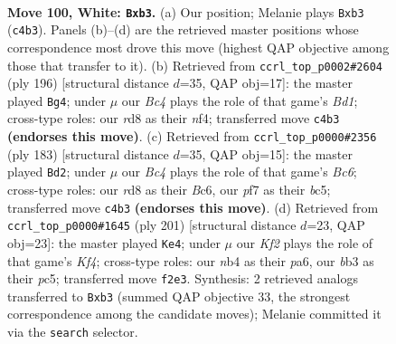 \documentclass[11pt]{article}
\begin{document}
\clearpage

\begin{figure}[p]\centering
\begin{subfigure}{0.46\textwidth}\centering
\resizebox{\linewidth}{!}{%
\newchessgame
\chessboard[
  setfen={3r4/5pk1/6p1/4P3/1nB2P1p/1b4P1/5K2/8 w - - 0 100},
  showmover=false,
  pgfstyle=straightmove, color=movearrow, markmove={c4-b3}
]}
\caption{}
\end{subfigure}\hfill
\begin{subfigure}{0.46\textwidth}\centering
\resizebox{\linewidth}{!}{%
\newchessgame
\chessboard[
  setfen={8/8/4p3/k2pP1N1/b1pP1n2/2P5/1K6/3B4 w - - 9 99},
  showmover=false,
  pgfstyle=straightmove, color=movearrow, markmove={d1-g4}
]}
\caption{}
\end{subfigure}
\\[4pt]
\begin{subfigure}{0.46\textwidth}\centering
\resizebox{\linewidth}{!}{%
\newchessgame
\chessboard[
  setfen={8/1p3p2/2b1p3/p1B1P2k/P4P2/2b3K1/8/2R5 b - - 7 92},
  showmover=false,
  pgfstyle=straightmove, color=movearrow, markmove={c3-d2}
]}
\caption{}
\end{subfigure}\hfill
\begin{subfigure}{0.46\textwidth}\centering
\resizebox{\linewidth}{!}{%
\newchessgame
\chessboard[
  setfen={8/8/P1b4p/2P2kp1/5p1P/8/3B2PK/8 b - - 3 101},
  showmover=false,
  pgfstyle=straightmove, color=movearrow, markmove={f5-e4}
]}
\caption{}
\end{subfigure}
\caption{\textbf{Move 100, White: \texttt{Bxb3}.} (a) Our position; Melanie plays \texttt{Bxb3} (\texttt{c4b3}). Panels (b)--(d) are the retrieved master positions whose correspondence most drove this move (highest QAP objective among those that transfer to it). (b) Retrieved from \texttt{ccrl\_top\_p0002\#2604} (ply 196) [structural distance $d$=35, QAP obj=17]: the master played \texttt{Bg4}; under $\mu$ our \emph{Bc4} plays the role of that game's \emph{Bd1}; cross-type roles: our \emph{r}d8 as their \emph{n}f4; transferred move \texttt{c4b3} \textbf{(endorses this move)}. (c) Retrieved from \texttt{ccrl\_top\_p0000\#2356} (ply 183) [structural distance $d$=35, QAP obj=15]: the master played \texttt{Bd2}; under $\mu$ our \emph{Bc4} plays the role of that game's \emph{Bc6}; cross-type roles: our \emph{r}d8 as their \emph{B}c6, our \emph{p}f7 as their \emph{b}c5; transferred move \texttt{c4b3} \textbf{(endorses this move)}. (d) Retrieved from \texttt{ccrl\_top\_p0000\#1645} (ply 201) [structural distance $d$=23, QAP obj=23]: the master played \texttt{Ke4}; under $\mu$ our \emph{Kf2} plays the role of that game's \emph{Kf4}; cross-type roles: our \emph{n}b4 as their \emph{p}a6, our \emph{b}b3 as their \emph{p}c5; transferred move \texttt{f2e3}. Synthesis: 2 retrieved analogs transferred to \texttt{Bxb3} (summed QAP objective 33, the strongest correspondence among the candidate moves); Melanie committed it via the \texttt{search} selector.}
\label{fig:thought-m198}
\end{figure}
\end{document}

